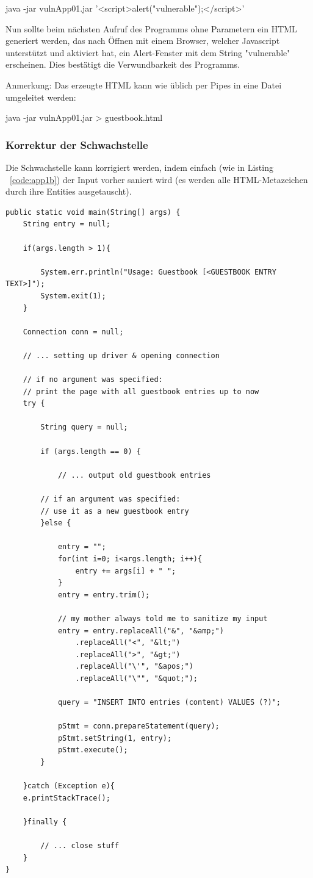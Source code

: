 \documentclass[12pt,a4paper,titlepage,oneside]{scrartcl}
\begin{document}
java -jar vulnApp01.jar '<script>alert("vulnerable");</script>'

Nun sollte beim nächsten Aufruf des Programms ohne Parametern ein HTML generiert werden, das nach Öffnen mit einem Browser, welcher Javascript unterstützt und aktiviert hat, ein Alert-Fenster mit dem String "vulnerable" erscheinen.
Dies bestätigt die Verwundbarkeit des Programms.

Anmerkung: Das erzeugte HTML kann wie üblich per Pipes in eine Datei umgeleitet werden:

java -jar vulnApp01.jar > guestbook.html

\subsubsection{Korrektur der Schwachstelle}
Die Schwachstelle kann korrigiert werden, indem einfach (wie in Listing ~\ref*{code:app1b}) der Input vorher saniert wird (es werden alle HTML-Metazeichen durch ihre Entities ausgetauscht).
\begin{lstlisting}[caption=XSS Schwachstelle behoben,label=code:app1b,style=c]
public static void main(String[] args) {
	String entry = null;
	
	if(args.length > 1){
	
		System.err.println("Usage: Guestbook [<GUESTBOOK ENTRY TEXT>]");
		System.exit(1);
	}
	
	Connection conn = null;
	
	// ... setting up driver & opening connection
	
	// if no argument was specified:
	// print the page with all guestbook entries up to now
	try {
	
		String query = null;
		
		if (args.length == 0) {
		
			// ... output old guestbook entries
			
		// if an argument was specified:
		// use it as a new guestbook entry
		}else {
		
			entry = "";
			for(int i=0; i<args.length; i++){
				entry += args[i] + " ";
			}
			entry = entry.trim();
			
			// my mother always told me to sanitize my input
			entry = entry.replaceAll("&", "&amp;")
				.replaceAll("<", "&lt;")
				.replaceAll(">", "&gt;")
				.replaceAll("\'", "&apos;")
				.replaceAll("\"", "&quot;");
			
			query = "INSERT INTO entries (content) VALUES (?)";
			
			pStmt = conn.prepareStatement(query);
			pStmt.setString(1, entry);
			pStmt.execute();
		}
	
	}catch (Exception e){
	e.printStackTrace();
	
	}finally {
	
		// ... close stuff
	}
}

\end{lstlisting}
\end{document}
